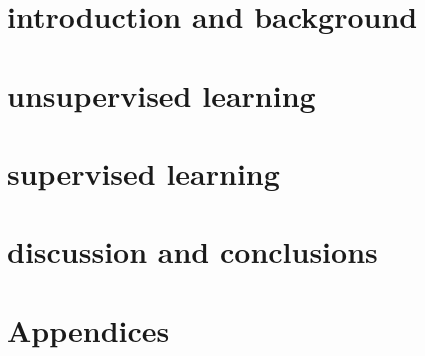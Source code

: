 \documentclass[\classfontsize,\papersize,twoside,showtrims,extrafontsizes]{memoir}  %
\begin{document}
\prefrontmatter

\cleartoevenpage

\cleartooddpage

\cleartoevenpage

\frontmatter







\clearforchapter
\printglossary[title=Abbreviations, toctitle=abbrevations, type=\acronymtype]

\clearforchapter
\printnomenclature
{}

\clearforchapter
\listoffigures*
{}

\clearforchapter
\listoftables*
{}

\clearforchapter
\tableofcontents*

\clearforchapter
\mylistoftodos

\mainmatter

\part[introduction and background]{introduction and background}




\part[unsupervised learning]{unsupervised learning}

\part[supervised learning]{supervised learning}

\part[discussion and conclusions]{discussion and conclusions}



\part[Appendices]{Appendices}
\appendix

\backmatter
\printbibliography
\end{document}
